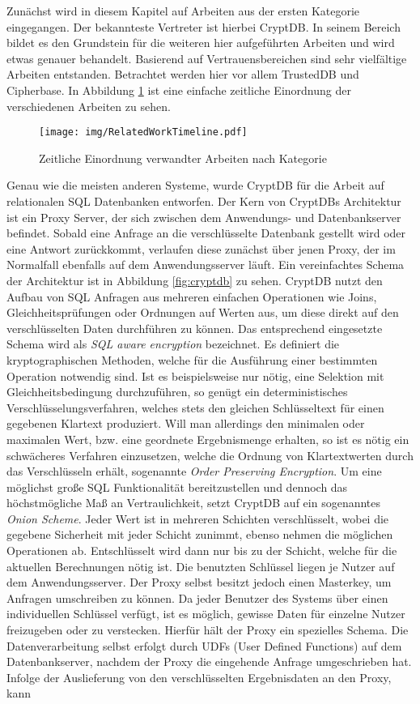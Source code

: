 Zunächst wird in diesem Kapitel auf Arbeiten aus der ersten Kategorie eingegangen. Der bekannteste Vertreter ist hierbei CryptDB. In seinem Bereich bildet es den Grundstein für die weiteren hier aufgeführten Arbeiten und wird etwas genauer behandelt. Basierend auf Vertrauensbereichen sind sehr vielfältige Arbeiten entstanden. Betrachtet werden hier vor allem TrustedDB und Cipherbase. In Abbildung \ref{fig:timeline} ist eine einfache zeitliche Einordnung der verschiedenen Arbeiten zu sehen.

\begin{figure}
	\texttt{[image: img/RelatedWorkTimeline.pdf]}
	\centering
	\caption{Zeitliche Einordnung verwandter Arbeiten nach Kategorie}
	\label{fig:timeline}
\end{figure}

Genau wie die meisten anderen Systeme, wurde CryptDB \cite{Popa2011}\cite{Popa2012} für die Arbeit auf relationalen SQL Datenbanken entworfen. Der Kern von CryptDBs Architektur ist ein Proxy Server, der sich zwischen dem Anwendungs- und  Datenbankserver befindet. Sobald eine Anfrage an die verschlüsselte Datenbank gestellt wird oder eine Antwort zurückkommt, verlaufen diese zunächst über jenen Proxy, der im Normalfall ebenfalls auf dem Anwendungsserver läuft. Ein vereinfachtes Schema der Architektur ist in Abbildung \ref{fig:cryptdb} zu sehen. CryptDB nutzt den Aufbau von SQL Anfragen aus mehreren einfachen Operationen wie Joins, Gleichheitsprüfungen oder Ordnungen auf Werten aus, um diese direkt auf den verschlüsselten Daten durchführen zu können. Das entsprechend eingesetzte Schema wird als \textit{SQL aware encryption} bezeichnet. Es definiert die kryptographischen Methoden, welche für die Ausführung einer bestimmten Operation notwendig sind. Ist es beispielsweise nur nötig, eine Selektion mit Gleichheitsbedingung durchzuführen, so genügt ein deterministisches Verschlüsselungsverfahren, welches stets den gleichen Schlüsseltext für einen gegebenen Klartext produziert. Will man allerdings den minimalen oder maximalen Wert, bzw. eine geordnete Ergebnismenge erhalten, so ist es nötig ein schwächeres Verfahren einzusetzen, welche die Ordnung von Klartextwerten durch das Verschlüsseln erhält, sogenannte \textit{Order Preserving Encryption}. Um eine möglichst große SQL Funktionalität bereitzustellen und dennoch das höchstmögliche Maß an Vertraulichkeit, setzt CryptDB auf ein sogenanntes \textit{Onion Scheme}. Jeder Wert ist in mehreren Schichten verschlüsselt, wobei die gegebene Sicherheit mit jeder Schicht zunimmt, ebenso nehmen die möglichen Operationen ab. Entschlüsselt wird dann nur bis zu der Schicht, welche für die aktuellen Berechnungen nötig ist. Die benutzten Schlüssel liegen je Nutzer auf dem Anwendungsserver. Der Proxy selbst besitzt jedoch einen Masterkey, um Anfragen umschreiben zu können. Da jeder Benutzer des Systems über einen individuellen Schlüssel verfügt, ist es möglich, gewisse Daten für einzelne Nutzer freizugeben oder zu verstecken. Hierfür hält der Proxy ein spezielles Schema. Die Datenverarbeitung selbst erfolgt durch UDFs (User Defined Functions) auf dem Datenbankserver, nachdem der Proxy die eingehende Anfrage umgeschrieben hat. Infolge der Auslieferung von den verschlüsselten Ergebnisdaten an den Proxy, kann 